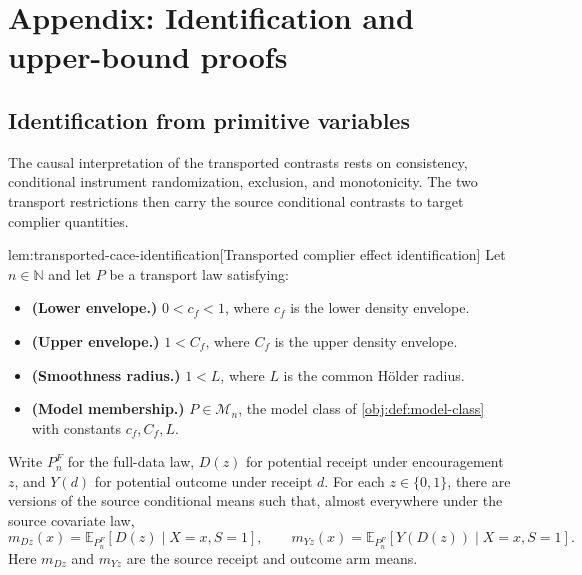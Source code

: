 \section{Appendix: Identification and upper-bound proofs}
\label{sec:upper-appendix}

\subsection{Identification from primitive variables}

The causal interpretation of the transported contrasts rests on consistency, conditional instrument randomization, exclusion, and monotonicity. The two transport restrictions then carry the source conditional contrasts to target complier quantities.

\begin{lemmav}{lem:transported-cace-identification}[Transported complier effect identification]
Let \(n\in\mathbb N\) and let \(P\) be a transport law satisfying:
\begin{itemize}
\item \textbf{(Lower envelope.)} \(0<c_f<1\), where \(c_f\) is the lower density envelope.
\item \textbf{(Upper envelope.)} \(1<C_f\), where \(C_f\) is the upper density envelope.
\item \textbf{(Smoothness radius.)} \(1<L\), where \(L\) is the common Hölder radius.
\item \textbf{(Model membership.)} \(P\in\mathcal M_n\), the model class of \cref{obj:def:model-class} with constants \(c_f,C_f,L\).
\end{itemize}
Write \(P_n^F\) for the full-data law, \(D(z)\) for potential receipt under encouragement \(z\), and \(Y(d)\) for potential outcome under receipt \(d\). For each \(z\in\{0,1\}\), there are versions of the source conditional means such that, almost everywhere under the source covariate law,
\[
m_{Dz}(x)
 =\mathbb E_{P_n^F}[D(z)\mid X=x,S=1],
\qquad
m_{Yz}(x)
 =\mathbb E_{P_n^F}[Y(D(z))\mid X=x,S=1].
\]
Here \(m_{Dz}\) and \(m_{Yz}\) are the source receipt and outcome arm means.


\end{lemmav}
